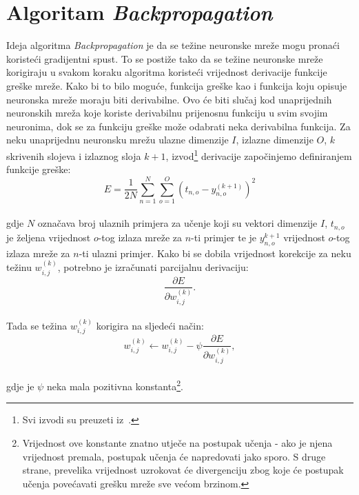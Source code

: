 \section{Algoritam \emph{Backpropagation}}
\label{sec:algoritam-backpropagation}
Ideja algoritma \emph{Backpropagation} je da se težine neuronske mreže mogu pronaći koristeći gradijentni spust. To se
postiže tako da se težine neuronske mreže korigiraju u svakom koraku algoritma koristeći vrijednost derivacije funkcije
greške mreže. Kako bi to bilo moguće, funkcija greške kao i funkcija koju opisuje neuronska mreže moraju biti
derivabilne. Ovo će biti slučaj kod unaprijednih neuronskih mreža koje koriste derivabilnu prijenosnu funkciju u svim
svojim neuronima, dok se za funkciju greške može odabrati neka derivabilna funkcija. Za neku unaprijednu neuronsku mrežu
ulazne dimenzije $I$, izlazne dimenzije $O$, $k$ skrivenih slojeva i izlaznog sloja $k + 1$, izvod\footnote{Svi izvodi
su preuzeti iz\ \citep{cupic2013}.} derivacije započinjemo definiranjem funkcije greške:\\
\begin{equation}
    E = \frac{1}{2N} \sum_{n = 1}^{N} \sum_{o = 1}^{O} \left(t_{n, o} - y_{n, o}^{(k + 1)}\right)^2\label{eq:error-func}
\end{equation}
\\
gdje $N$ označava broj ulaznih primjera za učenje koji su vektori dimenzije $I$, $t_{n, o}$ je željena vrijednost
$o$-tog izlaza mreže za $n$-ti primjer te je $y_{n, o}^{k + 1}$ vrijednost $o$-tog izlaza mreže za $n$-ti ulazni
primjer. Kako bi se dobila vrijednost korekcije za neku težinu $w_{i, j}^{(k)}$, potrebno je izračunati parcijalnu
derivaciju:\\
\begin{equation}
    \frac{\partial E}{\partial w_{i, j}^{(k)}}.\label{eq:error-w-derivation}
\end{equation}
\\
Tada se težina $w_{i, j}^{(k)}$ korigira na sljedeći način:\\
\begin{equation}
    w_{i, j}^{(k)} \leftarrow w_{i, j}^{(k)} - \psi \frac{\partial E}{\partial w_{i, j}^{(k)}},\label{eq:w-correction}
\end{equation}
\\
gdje je $\psi$ neka mala pozitivna konstanta\footnote{Vrijednost ove konstante znatno utječe na postupak učenja - ako je
njena vrijednost premala, postupak učenja će napredovati jako sporo. S druge strane, prevelika vrijednost uzrokovat će
divergenciju zbog koje će postupak učenja povećavati grešku mreže sve većom brzinom.}.


